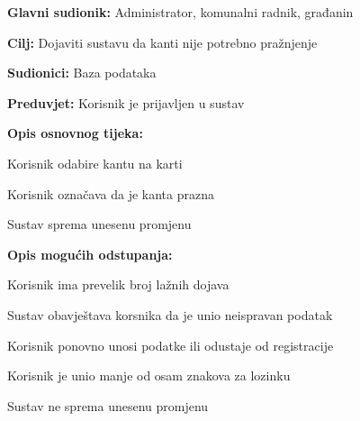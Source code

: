 					\noindent {}
					\begin{packed_item}
	
						\item \textbf{Glavni sudionik: }Administrator, komunalni radnik, građanin
						\item  \textbf{Cilj:} Dojaviti sustavu da kanti nije potrebno pražnjenje
						\item  \textbf{Sudionici:} Baza podataka
						\item  \textbf{Preduvjet:} Korisnik je prijavljen u sustav
						\item  \textbf{Opis osnovnog tijeka:}
						
						\item[] \begin{packed_enum}
	
							\item Korisnik odabire kantu na karti
							\item Korisnik označava da je kanta prazna
							\item Sustav sprema unesenu promjenu
							
						\end{packed_enum}
						
						\item  \textbf{Opis mogućih odstupanja:}
						
						\item[] \begin{packed_item}
	
							\item[2.a] Korisnik ima prevelik broj lažnih dojava
							
							\item[] \begin{packed_enum}
								
								\item Sustav obavještava korsnika da je unio neispravan podatak
								\item Korisnik ponovno unosi podatke ili odustaje od registracije
								
							\end{packed_enum}
							\item[2.b] Korisnik je unio manje od osam znakova za lozinku
							
								\item[] \begin{packed_enum}
								
								\item Sustav ne sprema unesenu promjenu
								
							\end{packed_enum}
							
						\end{packed_item}
					\end{packed_item}
				
